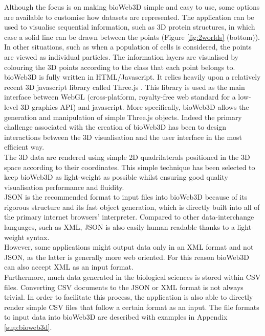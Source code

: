 Although the focus is on making bioWeb3D simple and easy to use, some options are available to customise how datasets are represented. The application can be used to visualise sequential information, such as 3D protein structures, in which case a solid line can be drawn between the points (Figure \ref{fig:2worlds} (bottom)). In other situations, such as when a population of cells is considered, the points are viewed as individual particles. The information layers are visualised by colouring the 3D points according to the class that each point belongs to. \\

bioWeb3D is fully written in HTML/Javascript. It relies heavily upon a relatively recent 3D javascript library called Three.js \citep{three}. This library is used as the main interface between WebGL (cross-platform, royalty-free web standard for a low-level 3D graphics API) \citep{webgl} and javascript. More specifically, bioWeb3D allows the generation and manipulation of simple Three.js objects. Indeed the primary challenge associated with the creation of bioWeb3D has been to design interactions between the 3D visualisation and the user interface in the most efficient way.\\

The 3D data are rendered using simple 2D quadrilaterals positioned in the 3D space according to their coordinates. This simple technique has been selected to keep bioWeb3D as light-weight as possible whilst ensuring good quality visualisation performance and fluidity.\\


JSON is the recommended format to input files into bioWeb3D because of its rigorous structure and its fast object generation, which is directly built into all of the primary internet browsers' interpreter. Compared to other data-interchange languages, such as XML, JSON is also easily human readable thanks to a light-weight syntax.\\

However, some applications might output data only in an XML format and not JSON, as the latter is generally more web oriented. For this reason bioWeb3D can also accept XML as an input format.\\

Furthermore, much data generated in the biological sciences is stored within CSV files. Converting CSV documents to the JSON or XML format is not always trivial. In order to facilitate this process, the application is also able to directly render simple CSV files that follow a certain format as an input. The file formats to input data into bioWeb3D are described with examples in Appendix \ref{sup:bioweb3d}.

